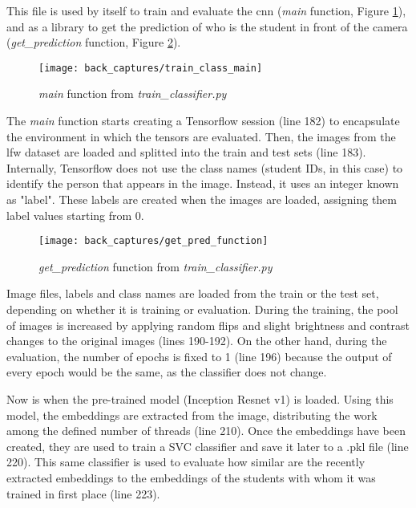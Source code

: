 	This file is used by itself to train and evaluate the \gls{cnn} (\textit{main} function, Figure \ref{fig:train_classifier_main}), and as a library to get the prediction of who is the student in front of the camera (\textit{get{\_}prediction} function, Figure \ref{fig:get_pred_function}). 

	\begin{figure}[!ht]
		\centering
		\texttt{[image: back\_captures/train\_class\_main]}
		\caption{\textit{main} function from \textit{train{\_}classifier.py}}
		\label{fig:train_classifier_main}
	\end{figure}

	The \textit{main} function starts creating a Tensorflow session (line 182) to encapsulate the environment in which the tensors are evaluated. Then, the images from the \gls{lfw} dataset are loaded and splitted into the train and test sets (line 183). Internally, Tensorflow does not use the class names (student IDs, in this case) to identify the person that appears in the image. Instead, it uses an integer known as "label". These labels are created when the images are loaded, assigning them label values starting from 0.  

	\begin{figure}[!ht]
		\centering
		\texttt{[image: back\_captures/get\_pred\_function]}
		\caption{\textit{get{\_}prediction} function from \textit{train{\_}classifier.py}}
		\label{fig:get_pred_function}
	\end{figure}

	Image files, labels and class names are loaded from the train or the test set, depending on whether it is training or evaluation. During the training, the pool of images is increased by applying random flips and slight brightness and contrast changes to the original images (lines 190-192). On the other hand, during the evaluation, the number of \glspl{epoch} is fixed to 1 (line 196) because the output of every epoch would be the same, as the classifier does not change.

	Now is when the pre-trained model (Inception Resnet v1) is loaded. Using this model, the \glspl{embedding} are extracted from the image, distributing the work among the defined number of threads (line 210). Once the embeddings have been created, they are used to train a SVC classifier and save it later to a .pkl file (line 220). This same classifier is used to evaluate how similar are the recently extracted embeddings to the embeddings of the students with whom it was trained in first place (line 223).


